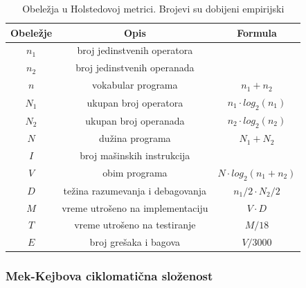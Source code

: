 \documentclass[a4paper]{article}
\begin{document}
\begin{table}[h]
\centering
 \begin{tabular}{|c|c|c|}
  \hline
  Obeležje & Opis & Formula \\ [0ex] 
  \hline
  $n_1$ & broj jedinstvenih operatora & \\ 
  \hline
  $n_2$ & broj jedinstvenih operanada & \\ 
  \hline
  $n$ & vokabular programa & $ n_1 + n_2 $ \\ 
  \hline
  $N_1$ & ukupan broj operatora & $ n_1 \cdot log_2(n_1) $ \\ 
  \hline
  $N_2$ & ukupan broj operanada & $ n_2 \cdot log_2(n_2) $ \\ 
  \hline
  $N$ & dužina programa & $ N_1 + N_2 $ \\
  \hline
  $I$ & broj mašinskih instrukcija & \\
  \hline
  $V$ & obim programa & $ N \cdot log_2(n_1+n_2) $ \\
  \hline
  $D$ & težina razumevanja i debagovanja & $ n_1/2 \cdot N_2 / 2  $ \\
  \hline
  $M$ & vreme utrošeno na implementaciju & $ V \cdot D $ \\
  \hline
  $T$ & vreme utrošeno na testiranje & $ M / 18 $ \\
  \hline
  $E$ & broj grešaka i bagova & $ V / 3000 $ \\
  \hline
 \end{tabular}
 \caption{Obeležja u Holstedovoj metrici. Brojevi su dobijeni empirijski \cite{ibm_halstead}}
 \label{tabela:1} 
\end{table}

\subsubsection{Mek-Kejbova ciklomatična složenost}
\label{subsec:mekkejb}
\end{document}
